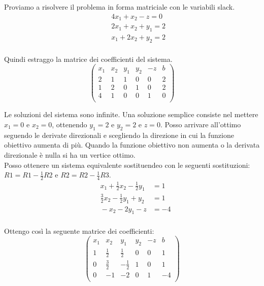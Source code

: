 \documentclass{article}
\begin{document}
Proviamo a risolvere il problema in forma matriciale con le variabili slack.
\begin{align*}
  &\quad 4x_1 + x_2 - z = 0\\ 
  &\quad 2x_1 + x_2 + y_1 = 2\\ 
  &\quad x_1 + 2x_2 + y_2 = 2\\ 
\end{align*}

Quindi estraggo la matrice dei coefficienti del sistema. 
\begin{equation*}
  \begin{pmatrix}
    x_1 & x_2 & y_1 & y_2 & -z & b\\
    2 & 1 & 1 & 0 & 0 & 2\\ 
    1 & 2 & 0 & 1 & 0 & 2\\ 
    4 & 1 & 0 & 0 & 1 & 0\\ 
  \end{pmatrix}
\end{equation*}

Le soluzioni del sistema sono infinite. Una soluzione semplice consiste nel 
mettere $x_1=0$ e $x_2=0$, ottenendo $y_1=2$ e $y_2=2$ e $z=0$. Posso arrivare 
all'ottimo seguendo le derivate direzionali e scegliendo la direzione in cui 
la funzione obiettivo aumenta di più. Quando la funzione obiettivo non aumenta o 
la derivata direzionale è nulla si ha un vertice ottimo.\\

Posso ottenere un sistema equivalente sostituendeo con le seguenti sostituzioni: 
$R1 = R1 - \frac{1}{2}R2$ e $R2 = R2 - \frac{1}{4}R3$.\\
\begin{align*}
  \quad x_1 + \frac{1}{2}x_2 - \frac{1}{2}y_1 &= 1\\ 
  \quad \frac{3}{2}x_2 - \frac{1}{2}y_1 + y_2 &= 1\\ 
  \quad -x_2 - 2y_1 -z &= -4\\ 
\end{align*}

Ottengo così la seguente matrice dei coefficienti:
\begin{equation*}
  \begin{pmatrix}
    x_1 & x_2 & y_1 & y_2 & -z & b\\
    1 & \frac{1}{2} & \frac{1}{2} & 0 & 0 & 1\\ 
    0 & \frac{3}{2} & -\frac{1}{2} & 1 & 0 & 1\\ 
    0 & -1 & -2 & 0 & 1 & -4\\ 
  \end{pmatrix}
\end{equation*}
\end{document}
